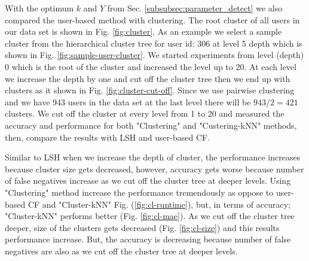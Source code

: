 \documentclass[conference]{IEEEtran}
\begin{document}
With the optimum $k$ and $Y$ from Sec. \ref{subsubsec:parameter_detect} we also
compared the user-based method with clustering. The root cluster of all users 
in our data set is shown in Fig. \ref{fig:cluster}. As an example we select a 
sample cluster from the hierarchical cluster tree for user id: 306 at level 5 
depth which is shown in Fig. \ref{fig:sample-user-cluster}. We started 
experiments from level (depth) 0 which is the root of the cluster and increased
the level up to 20. At each level we increase the depth by one and cut off the 
cluster tree then we end up with clusters as it shown in Fig. \ref{fig:cluster-cut-off}.
Since we use pairwise clustering and we have 943 users in the data set at the
last level there will be $943/2 = 421$ clusters. We cut off the cluster at every 
level from 1 to 20 and measured the accuracy and performance for both 
"Clustering" and "Custering-kNN" methods, then, compare the results with LSH 
and user-based CF.

Similar to LSH when we increase the depth of cluster, the performance increases 
because cluster size gets decreased, however, accuracy gets worse because number
of false negatives increase as we cut off the cluster tree at deeper levels. 
Using "Clustering" method increase the performance tremendously as oppose to 
user-based CF and "Cluster-kNN" Fig. (\ref{fig:cl-runtime}), but, in terms of accuracy; 
"Cluster-kNN" performs better (Fig. \ref{fig:cl-mae}). As we cut off the cluster tree 
deeper, size of the clusters gets decreased (Fig. \ref{fig:cl-size}) and this 
results performance increase. But, the accuracy is decreasing because number 
of false negatives are also as we cut off the cluster tree at deeper levels. 
\end{document}
